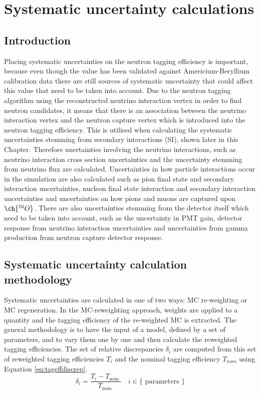 \chapter{Systematic uncertainty calculations}
\label{chp:syst}

\section{Introduction}

Placing systematic uncertainties on the neutron tagging efficiency is important, because even though the value has been validated against Americium-Beryllium calibration data there are still sources of systematic uncertainty that could affect this value that need to be taken into account. Due to the neutron tagging algorithm using the reconstructed neutrino interaction vertex in order to find neutron candidates, it means that there is an association between the neutrino interaction vertex and the neutron capture vertex which is introduced into the neutron tagging efficiency. This is utilised when calculating the systematic uncertainties stemming from secondary interactions (SI), shown later in this Chapter. Therefore unertainties involving the neutrino interactions, such as neutrino interaction cross section uncertainties and the uncertainty stemming from neutrino flux are calculated. Uncertainties in how particle interactions occur in the simulation are also calculated such as pion final state and secondary interaction uncertainties, nucleon final state interaction and secondary interaction uncertainties and uncertainties on how pions and muons are captured upon $\ch{^{16}O}$. There are also uncertainties stemming from the detector itself which need to be taken into account, such as the uncertainty in PMT gain, detector response from neutrino interaction uncertainties and uncertainties from gamma production from neutron capture detector response. 

\section{Systematic uncertainty calculation methodology}

Systematic uncertainties are calculated in one of two ways: MC re-weighting or MC regeneration.
\newline
In the MC-reweighting approach, weights are applied to a quantity and the tagging efficiency of the re-weighted MC is extracted. The general methodology is to have the input of a model, defined by a set of parameters, and to vary them one by one and then calculate the reweighted tagging efficiencies. The set of relative discrepancies $\delta_{i}$ are computed from this set of reweighted tagging efficiencies $T_{i}$ and the nominal tagging efficiency $T_{nom}$ using Equation \ref{eq:tageffdiscrep}.
\newline
\begin{equation}
    \delta_{i}=\frac{T_{i}-T_{\text {nom }}}{T_{\text {nom }}} \quad i \in\{\text { parameters }\}
\label{eq:tageffdiscrep}
\end{equation}
\newline

